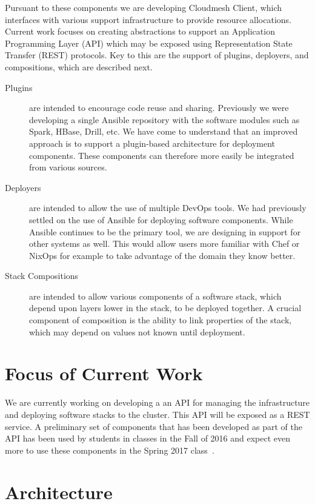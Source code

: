\documentclass[9pt,twocolumn,twoside]{styles/osajnl}
\begin{document}
Pursuant to these components we are developing Cloudmesh Client, which
interfaces with various support infrastructure to provide resource
allocations. Current work focuses on creating abstractions to support
an Application Programming Layer (API) which may be exposed using
Representation State Transfer (REST) protocols. Key to this are the
support of plugins, deployers, and compositions, which are described
next.


\begin{description}
\item[Plugins] are intended to encourage code reuse and sharing.
  Previously we were developing a single Ansible repository with the
  software modules such as Spark, HBase, Drill, etc. We have come to
  understand that an improved approach is to support a plugin-based
  architecture for deployment components. These components can
  therefore more easily be integrated from various sources.
\item[Deployers] are intended to allow the use of multiple DevOps
  tools. We had previously settled on the use of Ansible for deploying
  software components. While Ansible continues to be the primary tool,
  we are designing in support for other systems as well. This would
  allow users more familiar with Chef or NixOps for example to take
  advantage of the domain they know better.
\item[Stack Compositions] are intended to allow various components of
  a software stack, which depend upon layers lower in the stack, to be
  deployed together. A crucial component of composition is the ability
  to link properties of the stack, which may depend on values not
  known until deployment.
\end{description}



\section{Focus of Current Work}

We are currently working on developing a an API for managing the
infrastructure and deploying software stacks to the cluster. This API
will be exposed as a REST service. A preliminary set of components
that has been developed as part of the API has been used by students
in classes in the Fall of 2016 and expect even more to use these
components in the Spring 2017 class~\cite{www-i524}.


\section{Architecture}
\end{document}
